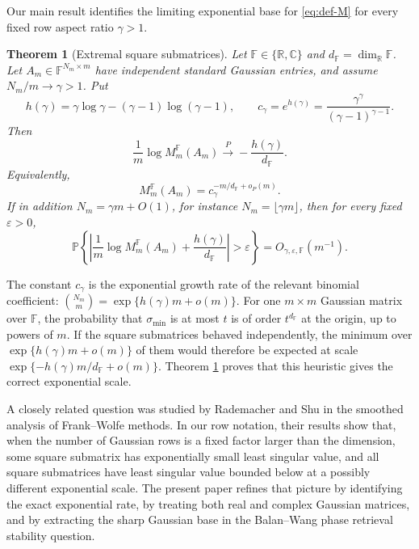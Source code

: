 \documentclass[10pt,a4paper]{amsart}
\newtheorem{theorem}{Theorem}[section]
\newcommand{\R}{\mathbb{R}}
\newcommand{\C}{\mathbb{C}}
\newcommand{\F}{\mathbb{F}}
\newcommand{\PP}{\mathbb{P}}
\begin{document}
Our main result identifies the limiting exponential base for \eqref{eq:def-M} for every fixed row
aspect ratio $\gamma>1$.


\begin{theorem}[Extremal square submatrices]\label{thm:general}
Let $\F\in\{\R,\C\}$ and $d_\F=\dim_\R\F$. Let $A_m\in\F^{N_m\times m}$ have independent standard
Gaussian entries, and assume $N_m/m\to\gamma>1$. Put
\begin{equation}\label{eq:hgamma}
  h(\gamma)=\gamma\log\gamma-(\gamma-1)\log(\gamma-1),
  \qquad c_\gamma=e^{h(\gamma)}=\frac{\gamma^\gamma}{(\gamma-1)^{\gamma-1}}.
\end{equation}
Then
\begin{equation}\label{eq:main-limit}
  \frac{1}{m}\log M_m^\F(A_m) \xrightarrow{P} -\frac{h(\gamma)}{d_\F}.
\end{equation}
Equivalently,
\begin{equation}\label{eq:base}
  M_m^\F(A_m)=c_\gamma^{-m/d_\F+o_P(m)}.
\end{equation}
If in addition $N_m=\gamma m+O(1)$, for instance $N_m=\lfloor\gamma m\rfloor$, then for every fixed
$\varepsilon>0$,
\begin{equation}\label{eq:rate}
  \PP\left\{\left|\frac{1}{m}\log M_m^\F(A_m)+\frac{h(\gamma)}{d_\F}\right|>\varepsilon\right\}
  =O_{\gamma,\varepsilon,\F}(m^{-1}).
\end{equation}
\end{theorem}


The constant $c_\gamma$ is the exponential growth rate of the relevant binomial coefficient:
$\binom{N_m}{m}=\exp\{h(\gamma)m+o(m)\}$. For one $m\times m$ Gaussian matrix over $\F$, the
probability that $\sigma_{\min}$ is at most $t$ is of order $t^{d_\F}$ at the origin, up to powers of
$m$. If the square submatrices behaved independently, the minimum over $\exp\{h(\gamma)m+o(m)\}$ of
them would therefore be expected at scale $\exp\{-h(\gamma)m/d_\F+o(m)\}$. Theorem \ref{thm:general}
proves that this heuristic gives the correct exponential scale.

A closely related question was studied by Rademacher and Shu \cite{RademacherShu2022} in the smoothed
analysis of Frank--Wolfe methods. In our row notation, their results show that, when the number of
Gaussian rows is a fixed factor larger than the dimension, some square submatrix has exponentially
small least singular value, and all square submatrices have least singular value bounded below at a
possibly different exponential scale. The present paper refines that picture by identifying the exact
exponential rate, by treating both real and complex Gaussian matrices, and by extracting the sharp
Gaussian base in the Balan--Wang phase retrieval stability question.
\end{document}
